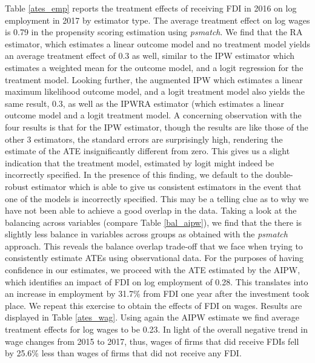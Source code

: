 Table \ref{ates_emp} reports the treatment effects of receiving FDI in 2016 on log employment in 2017 by estimator type. The average treatment effect on log wages is 0.79 in the propensity scoring estimation using \textit{psmatch}. We find that the RA estimator, which estimates a linear outcome model and no treatment model yields an average treatment effect of 0.3 as well, similar to the IPW estimator which estimates a weighted mean for the outcome model, and a logit regression for the treatment model. Looking further, the augmented IPW which estimates a linear maximum likelihood outcome model, and a logit treatment model also yields the same result, 0.3, as well as the IPWRA estimator (which estimates a linear outcome model and a logit treatment model. A concerning observation with the four results is that for the IPW estimator, though the results are like those of the other 3 estimators, the standard errors are surprisingly high, rendering the estimate of the ATE insignificantly different from zero. This gives us a slight indication that the treatment model, estimated by logit might indeed be incorrectly specified. In the presence of this finding, we default to the double-robust estimator which is able to give us consistent estimators in the event that one of the models is incorrectly specified. This may be a telling clue as to why we have not been able to achieve a good overlap in the data. Taking a look at the balancing across variables (compare Table \ref{bal_aipw}), we find that the there is slightly less balance in variables across groups as obtained with the \textit{psmatch} approach. This reveals the balance overlap trade-off that we face when trying to consistently estimate ATEs using observational data. For the purposes of having confidence in our estimates, we proceed with the ATE estimated by the AIPW, which identifies an impact of FDI on log employment of 0.28. This translates into an increase in employment by 31.7\% from FDI one year after the investment took place. We repeat this exercise to obtain the effects of FDI on wages. Results are displayed in Table \ref{ates_wag}. Using again the AIPW estimate we find average treatment effects for log wages to be 0.23. In light of the overall negative trend in wage changes from 2015 to 2017, thus, wages of firms that did receive FDIs fell by 25.6\% less than wages of firms that did not receive any FDI.



